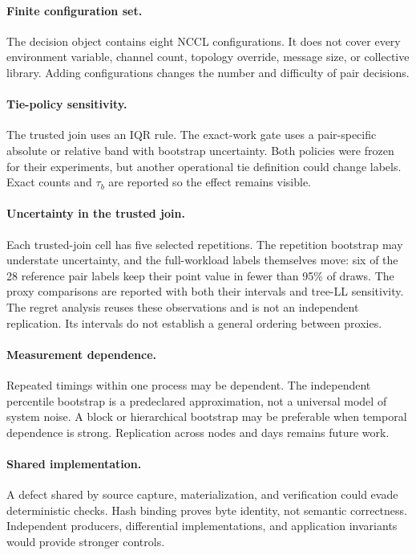 \documentclass[10pt,twocolumn]{article}
\begin{document}
\paragraph{Finite configuration set.} The decision object contains eight NCCL
configurations. It does not cover every environment variable, channel count,
topology override, message size, or collective library. Adding configurations
changes the number and difficulty of pair decisions.

\paragraph{Tie-policy sensitivity.} The trusted join uses an IQR rule. The
exact-work gate uses a pair-specific absolute or relative band with bootstrap
uncertainty. Both policies were frozen for their experiments, but another
operational tie definition could change labels. Exact counts and $\tau_b$ are
reported so the effect remains visible.

\paragraph{Uncertainty in the trusted join.} Each trusted-join cell has five
selected repetitions. The repetition bootstrap may understate uncertainty,
and the full-workload labels themselves move: six of the 28
reference pair labels keep their point value in fewer than 95\% of draws. The
proxy comparisons are reported with both their intervals and tree-LL
sensitivity. The regret analysis reuses these observations and is not an
independent replication. Its intervals do not establish a general ordering
between proxies.

\paragraph{Measurement dependence.} Repeated timings within one process may be
dependent. The independent percentile bootstrap is a predeclared approximation,
not a universal model of system noise. A block or hierarchical bootstrap may
be preferable when temporal dependence is strong. Replication across nodes and
days remains future work.

\paragraph{Shared implementation.} A defect shared by source capture,
materialization, and verification could evade deterministic checks. Hash
binding proves byte identity, not semantic correctness. Independent producers,
differential implementations, and application invariants would provide
stronger controls.
\end{document}
